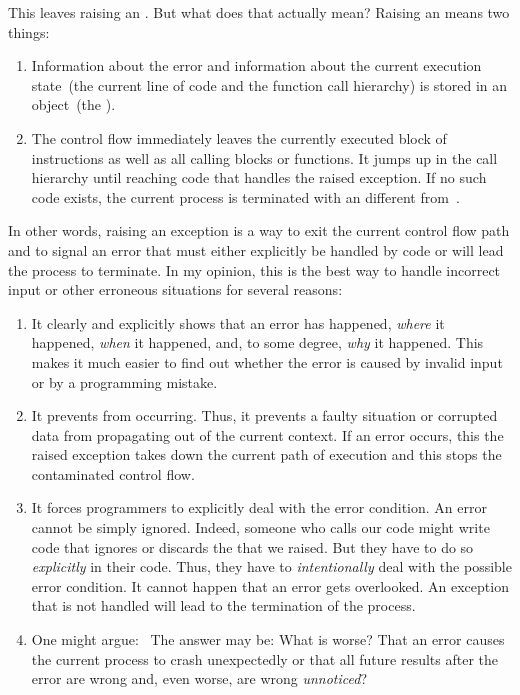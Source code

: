 This leaves raising an .
But what does that actually mean?
Raising an  means two things:%
%
\begin{enumerate}%
%
\item Information about the error and information about the current execution state~(the current line of code and the function call hierarchy) is stored in an object~(the ).%
%
\item The control flow immediately leaves the currently executed block of instructions as well as all calling blocks or functions.
It jumps up in the call hierarchy until reaching code that handles the raised exception.
If no such code exists, the current process is terminated with an  different from~.%
%
\end{enumerate}%
%
In other words, raising an exception is a way to exit the current control flow path and to signal an error that must either explicitly be handled by code or will lead the process to terminate.
In my opinion, this is the best way to handle incorrect input or other erroneous situations for several reasons:%
%
\begin{enumerate}%
%
\item It clearly and explicitly shows that an error has happened, \emph{where} it happened, \emph{when} it happened, and, to some degree, \emph{why} it happened.
This makes it much easier to find out whether the error is caused by invalid input or by a programming mistake.%
%
\item It prevents  from occurring.
Thus, it prevents a faulty situation or corrupted data from propagating out of the current context.
If an error occurs, this the raised exception takes down the current path of execution and this stops the contaminated control flow.%
%
\item It forces programmers to explicitly deal with the error condition.
An error cannot be simply ignored.
Indeed, someone who calls our code might write code that ignores or discards the  that we raised.
But they have to do so \emph{explicitly} in their code.
Thus, they have to \emph{intentionally} deal with the possible error condition.
It cannot happen that an error gets overlooked.
An exception that is not handled will lead to the termination of the process.%
%
\item One might argue:~\emph{}
The answer may be:
What is worse?
That an error causes the current process to crash unexpectedly or that all future results after the error are wrong and, even worse, are wrong \emph{unnoticed}?%
%
\end{enumerate}%
